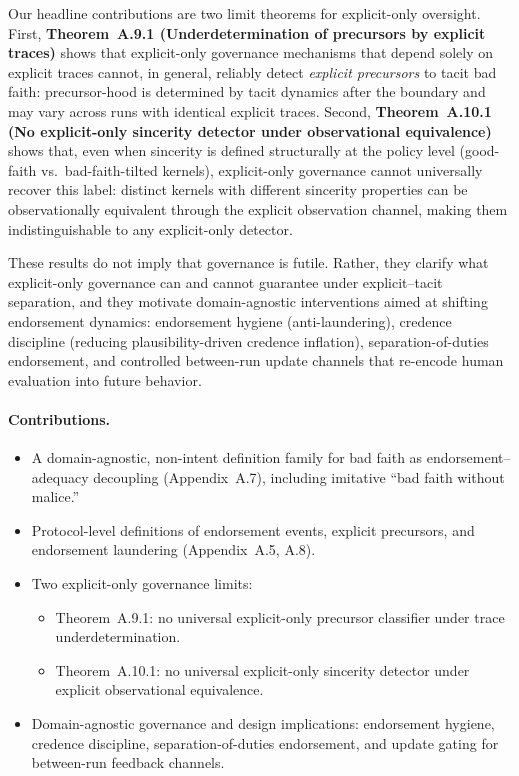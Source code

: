 \documentclass[preprints,article,submit,pdftex,moreauthors,accept]{Definitions/mdpi}
\begin{document}
Our headline contributions are two limit theorems for explicit-only oversight. First, \textbf{Theorem~A.9.1 (Underdetermination of precursors by explicit traces)} shows that explicit-only governance mechanisms that depend solely on explicit traces cannot, in general, reliably detect \emph{explicit precursors} to tacit bad faith: precursor-hood is determined by tacit dynamics after the boundary and may vary across runs with identical explicit traces. Second, \textbf{Theorem~A.10.1 (No explicit-only sincerity detector under observational equivalence)} shows that, even when sincerity is defined structurally at the policy level (good-faith vs.\ bad-faith-tilted kernels), explicit-only governance cannot universally recover this label: distinct kernels with different sincerity properties can be observationally equivalent through the explicit observation channel, making them indistinguishable to any explicit-only detector.

These results do not imply that governance is futile. Rather, they clarify what explicit-only governance can and cannot guarantee under explicit--tacit separation, and they motivate domain-agnostic interventions aimed at shifting endorsement dynamics: endorsement hygiene (anti-laundering), credence discipline (reducing plausibility-driven credence inflation), separation-of-duties endorsement, and controlled between-run update channels that re-encode human evaluation into future behavior.

\paragraph{Contributions.}
\begin{itemize}
  \item A domain-agnostic, non-intent definition family for bad faith as endorsement--adequacy decoupling (Appendix~A.7), including imitative ``bad faith without malice.''
  \item Protocol-level definitions of endorsement events, explicit precursors, and endorsement laundering (Appendix~A.5, A.8).
  \item Two explicit-only governance limits:
  \begin{itemize}
    \item Theorem~A.9.1: no universal explicit-only precursor classifier under trace underdetermination.
    \item Theorem~A.10.1: no universal explicit-only sincerity detector under explicit observational equivalence.
  \end{itemize}
  \item Domain-agnostic governance and design implications: endorsement hygiene, credence discipline, separation-of-duties endorsement, and update gating for between-run feedback channels.
\end{itemize}
\end{document}
